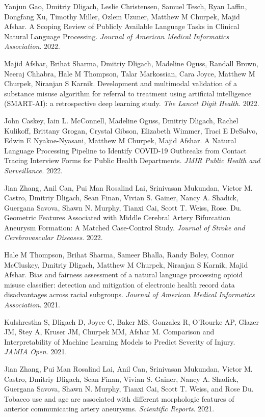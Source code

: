 \documentclass[letterpaper]{article}
\renewenvironment{itemize}{
  \begin{list}{}{
    \setlength{\leftmargin}{1.5em}
  }
}{
  \end{list}
}
\begin{document}
\begin{itemize}
\item Yanjun Gao, Dmitriy Dligach, Leslie Christensen, Samuel Tesch, Ryan Laffin, Dongfang Xu, Timothy Miller, Ozlem Uzuner, Matthew M Churpek, Majid Afshar. A Scoping Review of Publicly Available Language Tasks in Clinical Natural Language Processing. \emph{Journal of American Medical Informatics Association}. 2022.
\item Majid Afshar, Brihat Sharma, Dmitriy Dligach, Madeline Oguss, Randall Brown, Neeraj Chhabra, Hale M Thompson, Talar Markossian, Cara Joyce, Matthew M Churpek, Niranjan S Karnik. Development and multimodal validation of a substance misuse algorithm for referral to treatment using artificial intelligence (SMART-AI): a retrospective deep learning study. \emph{The Lancet Digit Health.} 2022.
\item John Caskey, Iain L. McConnell, Madeline Oguss, Dmitriy Dligach, Rachel Kulikoff, Brittany Grogan, Crystal Gibson, Elizabeth Wimmer, Traci E DeSalvo, Edwin E Nyakoe-Nyasani, Matthew M Churpek, Majid Afshar. A Natural Language Processing Pipeline to Identify COVID-19 Outbreaks from Contact Tracing Interview Forms for Public Health Departments. \emph{JMIR Public Health and Surveillance.} 2022.
\item Jian Zhang, Anil Can, Pui Man Rosalind Lai, Srinivasan Mukundan, Victor M. Castro, Dmitriy Dligach, Sean Finan, Vivian S. Gainer, Nancy A. Shadick, Guergana Savova, Shawn N. Murphy, Tianxi Cai, Scott T. Weiss, Rose. Du. Geometric Features Associated with Middle Cerebral Artery Bifurcation Aneurysm Formation: A Matched Case-Control Study. \emph{Journal of Stroke and Cerebrovascular Diseases}. 2022.
\item Hale M Thompson, Brihat Sharma, Sameer Bhalla, Randy Boley, Connor McCluskey, Dmitriy Dligach, Matthew M Churpek, Niranjan S Karnik, Majid Afshar. Bias and fairness assessment of a natural language processing opioid misuse classifier: detection and mitigation of electronic health record data disadvantages across racial subgroups. \emph{Journal of American Medical Informatics Association}. 2021.
\item Kulshrestha S, Dligach D, Joyce C, Baker MS, Gonzalez R, O’Rourke AP, Glazer JM, Stey A, Kruser JM, Churpek MM, Afshar M. Comparison and Interpretability of Machine Learning Models to Predict Severity of Injury. \emph{JAMIA Open}. 2021.
\item Jian Zhang, Pui Man Rosalind Lai, Anil Can, Srinivasan Mukundan, Victor M. Castro, Dmitriy Dligach, Sean Finan, Vivian S. Gainer, Nancy A. Shadick, Guergana Savova, Shawn N. Murphy, Tianxi Cai, Scott T. Weiss, and Rose Du. Tobacco use and age are associated with different morphologic features of anterior communicating artery aneurysms. \emph{Scientific Reports}. 2021.

\end{itemize}
\end{document}
